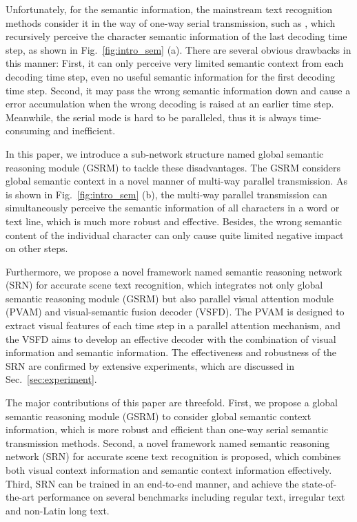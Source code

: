 \documentclass[10pt,twocolumn,letterpaper]{article}
\begin{document}
\begin{CJK}{UTF8}{gbsn}
Unfortunately, for the semantic information, the mainstream text recognition methods consider it in the way of one-way serial transmission, such as 
\cite{cheng2017focusing,shi2016robust,shi2018aster,wojna2017attention-2D,yang2019symmetry,yang2017learning-2D,zhan2019esir}, which recursively perceive the character semantic information of the last decoding time step, as shown in Fig.~\ref{fig:intro_sem} (a). 
There are several obvious drawbacks in this manner: First, it can only perceive very limited semantic context from each decoding time step, even no useful semantic information for the first decoding time step. Second, it may pass the wrong semantic information down and cause a error accumulation when the wrong decoding is raised at an earlier time step.
Meanwhile, the serial mode is hard to be paralleled, thus it is always time-consuming and inefficient.

In this paper, we introduce a sub-network structure named global semantic reasoning module (GSRM) to tackle these disadvantages. The GSRM considers global semantic context in a novel manner of multi-way parallel transmission. As is shown in Fig.~\ref{fig:intro_sem} (b), the multi-way parallel transmission can simultaneously perceive the semantic information of all characters in a word or text line, which is much more robust and effective. Besides, the wrong semantic content of the individual character can only cause quite limited negative impact on other steps.

Furthermore, we propose a novel framework named semantic reasoning network (SRN) for accurate scene text recognition, which integrates not only global semantic reasoning module (GSRM) but also parallel visual attention module (PVAM) and visual-semantic fusion decoder (VSFD). 
The PVAM is designed to extract visual features of each time step in a parallel attention mechanism, and the VSFD aims to develop an effective decoder with the combination of visual information and semantic information. 
The effectiveness and robustness of the SRN are confirmed by extensive experiments, which are discussed in Sec.~\ref{sec:experiment}.


The major contributions of this paper are threefold.
First, we propose a global semantic reasoning module (GSRM) to consider global semantic context information, which is more robust and efficient than one-way serial semantic transmission methods.
Second, a novel framework named semantic reasoning network (SRN) for accurate scene text recognition is proposed, which combines both visual context information and semantic context information effectively.
Third, SRN can be trained in an end-to-end manner, and achieve the state-of-the-art performance on several benchmarks including regular text, irregular text and non-Latin long text.


\end{CJK}
\end{document}
